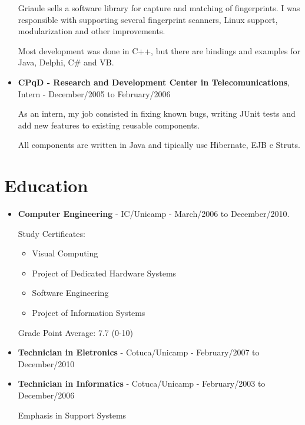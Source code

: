 \documentclass[a4paper,10pt]{article}
\begin{document}
\begin{itemize}
        Griaule sells a software library for capture and matching of fingerprints. I was responsible with supporting several fingerprint scanners, Linux support, modularization and other improvements.
        
        Most development was done in C++, but there are bindings and examples for Java, Delphi, C\# and VB.

      \item
        \textbf{CPqD - Research and Development Center in Telecomunications}, Intern - December/2005 to February/2006

        As an intern, my job consisted in fixing known bugs, writing JUnit tests and add new features to existing reusable components.

        All components are written in Java and tipically use Hibernate, EJB e Struts.
    \end{itemize}
    
  \section{Education}
    \begin{itemize}
      \item  
        \textbf{Computer Engineering} - IC/Unicamp - March/2006 to December/2010.

        Study Certificates:
        \begin{itemize}
          \item Visual Computing
          \item Project of Dedicated Hardware Systems
          \item Software Engineering
          \item Project of Information Systems
        \end{itemize}

        Grade Point Average: 7.7  (0-10)


      \item  
        \textbf{Technician in Eletronics} - Cotuca/Unicamp - February/2007 to December/2010


      \item  
        \textbf{Technician in Informatics} - Cotuca/Unicamp - February/2003 to December/2006

        Emphasis in Support Systems


    \end{itemize}
    
\end{document}
